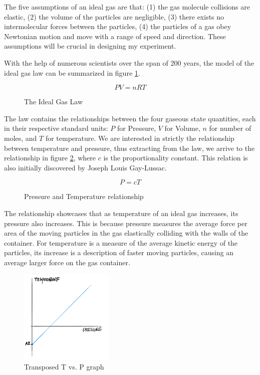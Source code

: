 \documentclass[a4paper,12pt]{article}
\begin{document}
The five assumptions of an ideal gas are that: (1) the gas molecule collisions are elastic, (2) the volume of the particles are negligible, (3) there exists no intermolecular forces between the particles, (4) the particles of a gas obey Newtonian motion and move with a range of speed and direction. These assumptions will be crucial in designing my experiment.

With the help of numerous scientists over the span of 200 years, the model of the ideal gas law can be summarized in figure \ref{fig:igl}.

\begin{figure}[H]
    \[
    PV = nRT
    \]
    \caption{The Ideal Gas Law}
    \label{fig:igl}
\end{figure}

The law contains the relationships between the four gaseous state quantities, each in their respective standard units: $P$ for Pressure, $V$ for Volume, $n$ for number of moles, and $T$ for temperature. We are interested in strictly the relationship between temperature and pressure, thus extracting from the law, we arrive to the relationship in figure \ref{fig:pt}, where $c$ is the proportionality constant. This relation is also initially discovered by Joseph Louis Gay-Lussac.

\begin{figure}[H]
    \[
    P = cT
    \]
    \caption{Pressure and Temperature relationship}
    \label{fig:pt}
\end{figure}

The relationship showcases that as temperature of an ideal gas increases, its pressure also increases. This is because pressure measures the average force per area of the moving particles in the gas elastically colliding with the walls of the container. For temperature is a measure of the average kinetic energy of the particles, its increase is a description of faster moving particles, causing an average larger force on the gas container.




\begin{figure}
    \centering
    \includegraphics[width=0.4\textwidth]{assets/az.png}
    \caption{Transposed T vs. P graph}
    \label{fig:az}
\end{figure}
\end{document}

